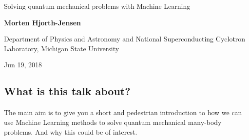 \documentclass[%
oneside,                 %
final,                   %
10pt]{article}
\begin{document}

\newcommand{\exercisesection}[1]{\subsection*{#1}}






\thispagestyle{empty}

\begin{center}
{\LARGE\bf
\begin{spacing}{1.25}
Solving quantum mechanical problems with Machine Learning
\end{spacing}
}
\end{center}


\begin{center}
{\bf Morten Hjorth-Jensen}
\end{center}

    \begin{center}
\centerline{{\small Department of Physics and Astronomy and National Superconducting Cyclotron Laboratory, Michigan State University}}
\end{center}
    

\begin{center}
Jun 19, 2018 
\end{center}

\vspace{1cm}


\subsection{What is this talk about?}

\paragraph{}
The main aim is to give you a short and pedestrian introduction to  how we can use Machine Learning methods
to solve quantum mechanical many-body problems. And why this could be of interest. 
\end{document}
